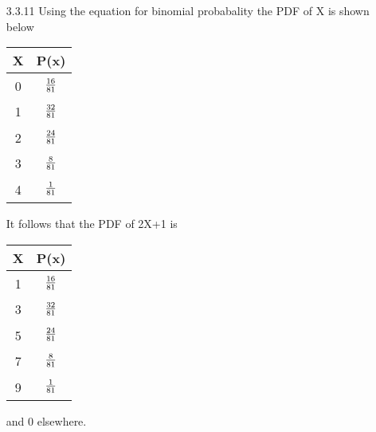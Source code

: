 \documentclass[11pt,fleqn]{article}
\begin{document}
\begin{enumerate}
\item[3.3.11]
Using the equation for binomial probabality the PDF of X is shown below

\begin{tabular} {c c}
X & P(x) \\
\hline
0 & $\tabfrac{16}{81}$ \\
1 & $\tabfrac{32}{81}$ \\
2 & $\tabfrac{24}{81}$ \\
3 & $\tabfrac{8}{81}$ \\
4 & $\tabfrac{1}{81}$ \\
\end{tabular}

It follows that the PDF of 2X+1 is

\begin{tabular} {c c}
X & P(x) \\
\hline
1 & $\tabfrac{16}{81}$ \\
3 & $\tabfrac{32}{81}$ \\
5 & $\tabfrac{24}{81}$ \\
7 & $\tabfrac{8}{81}$ \\
9 & $\tabfrac{1}{81}$ \\
\end{tabular}
 
and 0 elsewhere. 

\end{enumerate}
\end{document}
